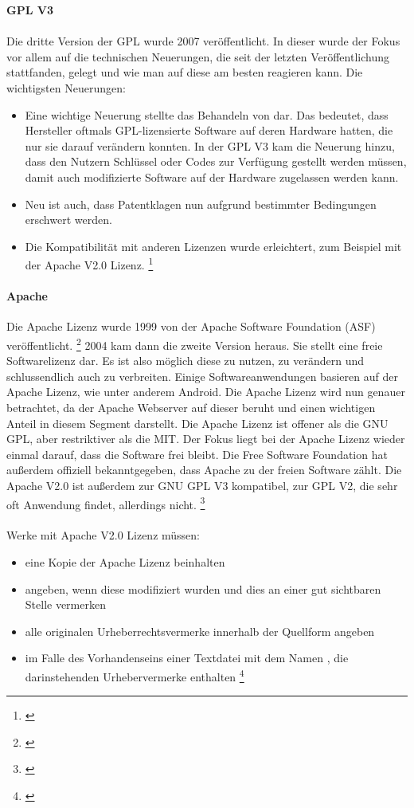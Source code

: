 \documentclass[titlepage,12pt,twoside]{article}
\begin{document}
\hfill \break
\textbf{GPL V3} \\
\\
Die dritte Version der GPL wurde 2007 veröffentlicht. In dieser wurde der Fokus vor allem auf die technischen 
Neuerungen, die seit der letzten Veröffentlichung stattfanden, gelegt und wie man auf diese am besten 
reagieren kann. Die wichtigsten Neuerungen: \\
\begin{itemize}
	\item Eine wichtige Neuerung stellte das Behandeln von  dar. Das bedeutet, dass 
	Hersteller oftmals GPL-lizensierte Software auf deren Hardware hatten, die nur sie darauf verändern 
	konnten. In der GPL V3 kam die Neuerung hinzu, dass den Nutzern Schlüssel oder Codes zur Verfügung 
	gestellt werden müssen, damit auch modifizierte Software auf der Hardware zugelassen werden kann.
	\item Neu ist auch, dass Patentklagen nun aufgrund bestimmter Bedingungen erschwert werden.
	\item Die Kompatibilität mit anderen Lizenzen wurde erleichtert, zum Beispiel mit der Apache V2.0 Lizenz. \footnote{\cite{WikipediaGPL4}}
\end{itemize}
\hfill \break
\paragraph{Apache}
\label{par:Apache}
\hfill \break
\hfill \break
Die Apache Lizenz wurde 1999 von der Apache Software Foundation (ASF) veröffentlicht. \footnote{\cite{Apache}} 2004 kam dann die 
zweite Version heraus. Sie stellt eine freie Softwarelizenz dar. Es ist also möglich diese zu nutzen, zu 
verändern und schlussendlich auch zu verbreiten. Einige Softwareanwendungen basieren auf der Apache Lizenz, 
wie unter anderem Android. Die Apache Lizenz wird nun genauer betrachtet, da der Apache Webserver auf dieser beruht und einen wichtigen Anteil 
in diesem Segment darstellt. Die Apache Lizenz ist offener als die GNU GPL, aber restriktiver als die MIT. Der Fokus liegt bei der Apache Lizenz wieder einmal darauf, dass die 
Software frei bleibt. Die Free Software Foundation hat außerdem offiziell bekanntgegeben, dass Apache zu der 
freien Software zählt. Die Apache V2.0 ist außerdem zur GNU GPL V3 kompatibel, zur GPL V2, die sehr oft 
Anwendung findet, allerdings nicht. \footnote{\cite{WikipediaApache}} \\
\\
Werke mit Apache V2.0 Lizenz müssen: \\
\begin{itemize}
	\item eine Kopie der Apache Lizenz beinhalten
	\item angeben, wenn diese modifiziert wurden und dies an einer gut sichtbaren Stelle vermerken
	\item alle originalen Urheberrechtsvermerke innerhalb der Quellform angeben
	\item im Falle des Vorhandenseins einer Textdatei mit dem Namen , die 
	darinstehenden Urhebervermerke enthalten \footnote{\cite{WikipediaApache}}
\end{itemize}
\newpage
\end{document}
